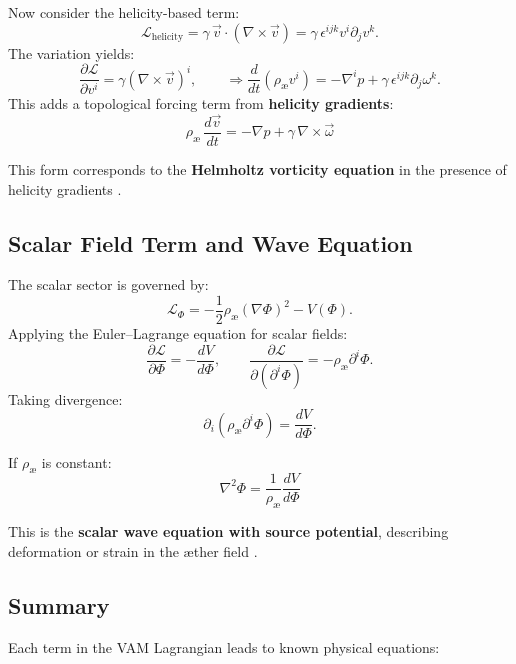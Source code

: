\documentclass[12pt]{article}
\begin{document}
Now consider the helicity-based term:
\[
    \mathcal{L}_{\text{helicity}} = \gamma\, \vec{v} \cdot (\nabla \times \vec{v}) = \gamma\, \epsilon^{ijk} v^i \partial_j v^k.
\]
The variation yields:
\[
    \frac{\partial \mathcal{L}}{\partial v^i} = \gamma (\nabla \times \vec{v})^i, \qquad
    \Rightarrow \frac{d}{dt}(\rho_\text{\ae} v^i) = -\nabla^i p + \gamma\, \epsilon^{ijk} \partial_j \omega^k.
\]
This adds a topological forcing term from \textbf{helicity gradients}:
\begin{equation}
    \boxed{
        \rho_\text{\ae}\, \frac{d \vec{v}}{dt} = -\nabla p + \gamma\, \nabla \times \vec{\omega}
    }
\end{equation}

This form corresponds to the \textbf{Helmholtz vorticity equation} in the presence of helicity gradients \cite{moffatt1969}.

\subsection*{Scalar Field Term and Wave Equation}

The scalar sector is governed by:
\[
    \mathcal{L}_\Phi = - \frac{1}{2} \rho_\text{\ae} (\nabla \Phi)^2 - V(\Phi).
\]
Applying the Euler–Lagrange equation for scalar fields:
\[
    \frac{\partial \mathcal{L}}{\partial \Phi} = - \frac{dV}{d\Phi}, \qquad
    \frac{\partial \mathcal{L}}{\partial (\partial^i \Phi)} = -\rho_\text{\ae} \partial^i \Phi.
\]
Taking divergence:
\[
    \partial_i ( \rho_\text{\ae} \partial^i \Phi ) = \frac{dV}{d\Phi}.
\]

If $\rho_\text{\ae}$ is constant:
\begin{equation}
    \boxed{
        \nabla^2 \Phi = \frac{1}{\rho_\text{\ae}} \frac{dV}{d\Phi}
    }
\end{equation}

This is the \textbf{scalar wave equation with source potential}, describing deformation or strain in the æther field \cite{barcelo2011}.

\subsection*{Summary}

Each term in the VAM Lagrangian leads to known physical equations:
\end{document}
